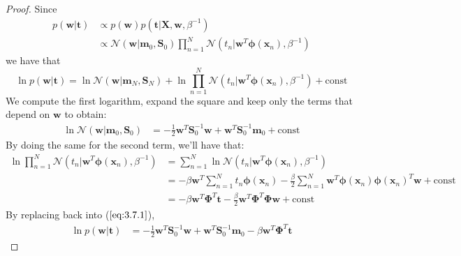 \vspace{1em}

\begin{proof}
    Since 
    \begin{align*}
        p(\mathbf{w} | \mathbf{t})
        &\propto p(\mathbf{w}) p(\mathbf{t} | \mathbf{X}, \mathbf{w}, \beta^{-1}) \\
        &\propto \mathcal{N}(\mathbf{w} | \mathbf{m}_0, \mathbf{S}_0) 
            \prod_{n=1}^N \mathcal{N}(t_n | \mathbf{w}^T\bm{\phi}(\mathbf{x}_n), \beta^{-1})
    \end{align*}
    we have that
    \begin{equation}\label{eq:3.7.1}\tag{3.7.1}
        \ln p(\mathbf{w} | \mathbf{t})
        = \ln \mathcal{N}(\mathbf{w} | \mathbf{m}_N, \mathbf{S}_N) 
            + \ln \prod_{n=1}^N \mathcal{N}(t_n | \mathbf{w}^T\bm{\phi}(\mathbf{x}_n), \beta^{-1}) 
            + \text{const}
    \end{equation}
    We compute the first logarithm, expand the square and keep only the terms that depend
    on $\mathbf{w}$ to obtain:
    \begin{align*}
        \ln \mathcal{N}(\mathbf{w} | \mathbf{m}_0, \mathbf{S}_0)
        &= -\frac{1}{2} \mathbf{w}^T \mathbf{S}_0^{-1} \mathbf{w} 
            + \mathbf{w}^T\mathbf{S}_0^{-1}\mathbf{m}_0
            + \text{const}
    \end{align*}
    By doing the same for the second term, we'll have that:
    \begin{align*}
        \ln \prod_{n = 1}^N \mathcal{N}(t_n | \mathbf{w}^T \bm{\phi}(\mathbf{x}_n), \beta^{-1})   
        &= \sum_{n=1}^N \ln \mathcal{N}(t_n | \mathbf{w}^T \bm{\phi}(\mathbf{x}_n), \beta^{-1}) \\
        &= -\beta \mathbf{w}^T \sum_{n=1}^N t_n \bm{\phi}(\mathbf{x}_n) 
            - \frac{\beta}{2} \sum_{n=1}^N \mathbf{w}^T \bm{\phi}(\mathbf{x}_n)\bm{\phi}(\mathbf{x}_n)^T \mathbf{w} 
            + \text{const} \\
        &= -\beta \mathbf{w}^T \mathbf{\Phi}^T \mathbf{t} 
            - \frac{\beta}{2} \mathbf{w}^T\mathbf{\Phi}^T\mathbf{\Phi}\mathbf{w} + \text{const}
    \end{align*}
    By replacing back into ($\ref{eq:3.7.1}$),
    \begin{align*}
        \ln p(\mathbf{w} | \mathbf{t}) 
        &= -\frac{1}{2} \mathbf{w}^T\mathbf{S}_0^{-1}\mathbf{w} 
            + \mathbf{w}^T\mathbf{S}_0^{-1}\mathbf{m}_0
            -\beta\mathbf{w}^T\mathbf{\Phi}^T\mathbf{t}

\end{align*}
\end{proof}
